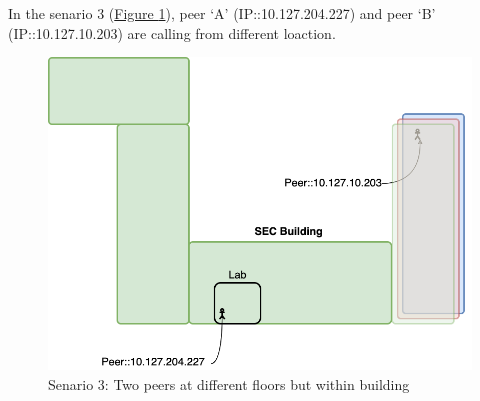 	In the senario 3 (\hyperref[fig:scene-3]{Figure \ref{fig:scene-3}}), peer `A' (IP::10.127.204.227) and peer `B' (IP::10.127.10.203) are calling from different loaction.
	\begin{figure}[hb]
		\begin{minipage}{\textwidth}
			\includegraphics[scale=0.29]{Images/experiment/senarios/diff_floor.drawio.png}
		\end{minipage}
		\caption{Senario 3: Two peers at different floors but within building}
		\label{fig:scene-3}
	\end{figure}


